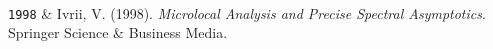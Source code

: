 \documentclass[9pt,a4paper]{article}
\newcommand{\Duration}[2]{\fontsize{10pt}{0}\selectfont \texttt{#1-#2}}
\newcommand{\Year}[1]{\fontsize{10pt}{0}\selectfont \texttt{#1}}
\newcommand{\Website}[1]{\href{https://#1}{#1}}
\begin{document}
\begin{EntriesTableYear}
  \\ %
  \Year{1998} & Ivrii, V. (1998).  \textit{Microlocal Analysis and
    Precise Spectral Asymptotics}.  Springer Science \& Business
  Media. %
\end{EntriesTableYear}





\end{document}

